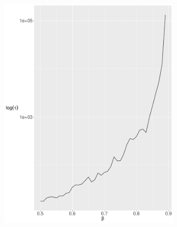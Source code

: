 \documentclass[12pt, oneside]{article}   	%
\begin{document}
\begin{figure}[H]
\begin{subfigure}[b]{0.475\textwidth}
            \includegraphics[width=\textwidth, height=0.5\textheight]{2.pdf}
        \end{subfigure} 
\end{figure}
\end{document}
